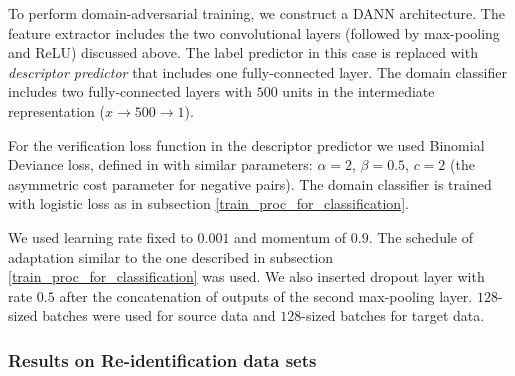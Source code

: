 To perform domain-adversarial training, we construct a DANN architecture.  The feature extractor includes the two convolutional layers (followed by max-pooling and ReLU) discussed above. The label predictor in this case is replaced with \textit{descriptor predictor} that includes one fully-connected layer. The domain classifier includes two fully-connected layers with $500$ units in the intermediate representation ($x{\rightarrow}500{\rightarrow}1$). 

For the verification loss function in the descriptor predictor we used Binomial Deviance loss, defined in \citet{YiLL14} with similar parameters: $\alpha = 2$, $\beta = 0.5$, $c = 2$ (the asymmetric cost parameter for negative pairs). The domain classifier is trained with logistic loss as in subsection  \ref{train_proc_for_classification}.

We used learning rate fixed to $0.001$ and momentum of $0.9$. The schedule of adaptation similar to the one described in subsection \ref{train_proc_for_classification} was used. We also inserted dropout layer with rate $0.5$ after the concatenation of outputs of the second max-pooling layer. $128$-sized batches were used for source data and $128$-sized batches for target data. 


\subsubsection{Results on Re-identification data sets} 

